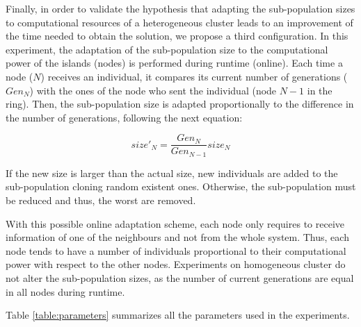 Finally, in order to validate the hypothesis that adapting the
sub-population sizes to computational resources of a heterogeneous
cluster leads to an improvement of the time needed to obtain the
solution,  %
we propose a third configuration. In this experiment, the adaptation
of the sub-population size to the computational power of the islands
(nodes) is performed during runtime (online). %
  Each time a node ($N$) receives an individual, it compares its
  current number of generations ($Gen_{N}$) with the ones of the node
  who sent the individual (node $N-1$ in the ring). Then, the
  sub-population size is adapted proportionally to the difference in
  the number of generations, following the next equation: %

\begin{equation}
size'_{N}=\dfrac{Gen_{N}}{Gen_{N-1}}size_{N}
\end{equation}

If the new size is larger than the actual size, new individuals are added to the sub-population cloning random existent ones. Otherwise, the sub-population must be reduced and thus, the worst are removed.

With this possible online adaptation scheme, each node only requires to receive information of one of the neighbours and not from the whole system. Thus, each node tends to have a number of individuals proportional to their computational power with respect to the other nodes. Experiments on homogeneous cluster do not alter the sub-population sizes, as the number of current generations are equal in all nodes during runtime.

Table \ref{table:parameters} summarizes all the parameters used in the experiments.

